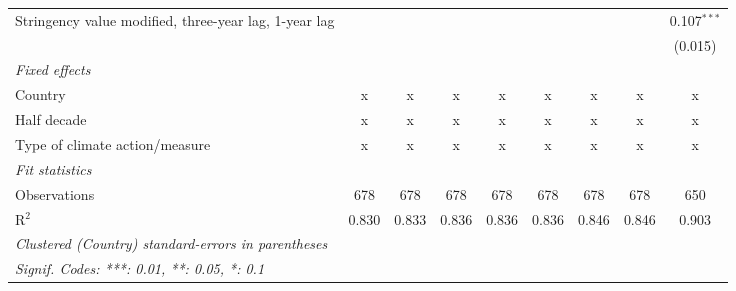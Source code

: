 \begin{table}[htbp]
\begin{tabular}{lcccccccc}
      Stringency value modified, three-year lag, 1-year lag                       &                &               &               &               &               &                &                & 0.107$^{***}$\\   
                                                                                  &                &               &               &               &               &                &                & (0.015)\\   
      \emph{Fixed effects}\\
      Country                                                                     & x              & x             & x             & x             & x             & x              & x              & x\\  
      Half decade                                                                 & x              & x             & x             & x             & x             & x              & x              & x\\  
      Type of climate action/measure                                              & x              & x             & x             & x             & x             & x              & x              & x\\  
      \midrule \emph{Fit statistics}\\
      Observations                                                                & 678            & 678           & 678           & 678           & 678           & 678            & 678            & 650\\  
      R$^2$                                                                       & 0.830          & 0.833         & 0.836         & 0.836         & 0.836         & 0.846          & 0.846          & 0.903\\  
      \midrule
      \multicolumn{9}{l}{\emph{Clustered (Country) standard-errors in parentheses}}\\
      \multicolumn{9}{l}{\emph{Signif. Codes: ***: 0.01, **: 0.05, *: 0.1}}\\
   \end{tabular}
\end{table}


